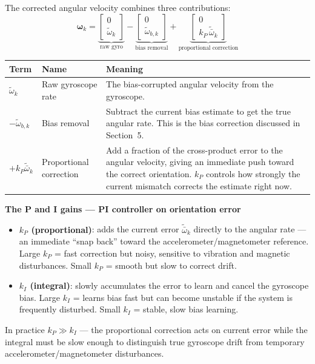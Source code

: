 \documentclass[12pt, a4paper]{article}
\begin{document}
The corrected angular velocity combines three contributions:
\[
  \boldsymbol{\omega}_k
  = \underbrace{\begin{bmatrix} 0 \\ \tilde{\omega}_k \end{bmatrix}}_{\text{raw gyro}}
  - \underbrace{\begin{bmatrix} 0 \\ \tilde{\omega}_{b,k} \end{bmatrix}}_{\text{bias removal}}
  + \underbrace{\begin{bmatrix} 0 \\ k_P\,\tilde{\bar{\omega}}_k \end{bmatrix}}_{\text{proportional correction}}
\]

\begin{center}
\begin{tabular}{@{} l p{3.2cm} p{7.2cm} @{}}
  \toprule
  Term & Name & Meaning \\
  \midrule
  $\tilde{\omega}_k$ & Raw gyroscope rate &
    The bias-corrupted angular velocity from the gyroscope. \\[3pt]
  $-\tilde{\omega}_{b,k}$ & Bias removal &
    Subtract the current bias estimate to get the true angular rate.
    This is the bias correction discussed in Section~5. \\[3pt]
  $+k_P\tilde{\bar{\omega}}_k$ & Proportional correction &
    Add a fraction of the cross-product error to the angular velocity,
    giving an immediate push toward the correct orientation.
    $k_P$ controls how strongly the current mismatch corrects the estimate
    right now. \\
  \bottomrule
\end{tabular}
\end{center}

\begin{notebox}
  \textbf{The P and I gains --- PI controller on orientation error}

  \begin{itemize}[leftmargin=1.2em, itemsep=3pt]
    \item \textbf{$k_P$ (proportional)}: adds the current error
      $\tilde{\bar{\omega}}_k$ directly to the angular rate --- an
      immediate ``snap back'' toward the accelerometer/magnetometer
      reference.
      Large $k_P$ = fast correction but noisy, sensitive to vibration
      and magnetic disturbances.
      Small $k_P$ = smooth but slow to correct drift.

    \item \textbf{$k_I$ (integral)}: slowly accumulates the error to
      learn and cancel the gyroscope bias.
      Large $k_I$ = learns bias fast but can become unstable if the
      system is frequently disturbed.
      Small $k_I$ = stable, slow bias learning.
  \end{itemize}

  In practice $k_P \gg k_I$ --- the proportional correction acts on
  current error while the integral must be slow enough to distinguish
  true gyroscope drift from temporary accelerometer/magnetometer
  disturbances.
\end{notebox}
\end{document}
